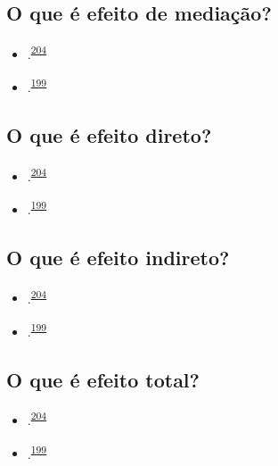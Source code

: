 \documentclass[
  a4paper,
]{book}
\begin{document}
\hypertarget{o-que-uxe9-efeito-de-mediauxe7uxe3o}{%
\subsection{O que é efeito de mediação?}\label{o-que-uxe9-efeito-de-mediauxe7uxe3o}}

\begin{itemize}
\item
  .\textsuperscript{\protect\hyperlink{ref-Baron1986}{204}}
\item
  .\textsuperscript{\protect\hyperlink{ref-Bours2023}{199}}
\end{itemize}

\hypertarget{o-que-uxe9-efeito-direto}{%
\subsection{O que é efeito direto?}\label{o-que-uxe9-efeito-direto}}

\begin{itemize}
\item
  .\textsuperscript{\protect\hyperlink{ref-Baron1986}{204}}
\item
  .\textsuperscript{\protect\hyperlink{ref-Bours2023}{199}}
\end{itemize}

\hypertarget{o-que-uxe9-efeito-indireto}{%
\subsection{O que é efeito indireto?}\label{o-que-uxe9-efeito-indireto}}

\begin{itemize}
\item
  .\textsuperscript{\protect\hyperlink{ref-Baron1986}{204}}
\item
  .\textsuperscript{\protect\hyperlink{ref-Bours2023}{199}}
\end{itemize}

\hypertarget{o-que-uxe9-efeito-total}{%
\subsection{O que é efeito total?}\label{o-que-uxe9-efeito-total}}

\begin{itemize}
\item
  .\textsuperscript{\protect\hyperlink{ref-Baron1986}{204}}
\item
  .\textsuperscript{\protect\hyperlink{ref-Bours2023}{199}}
\end{itemize}
\end{document}

